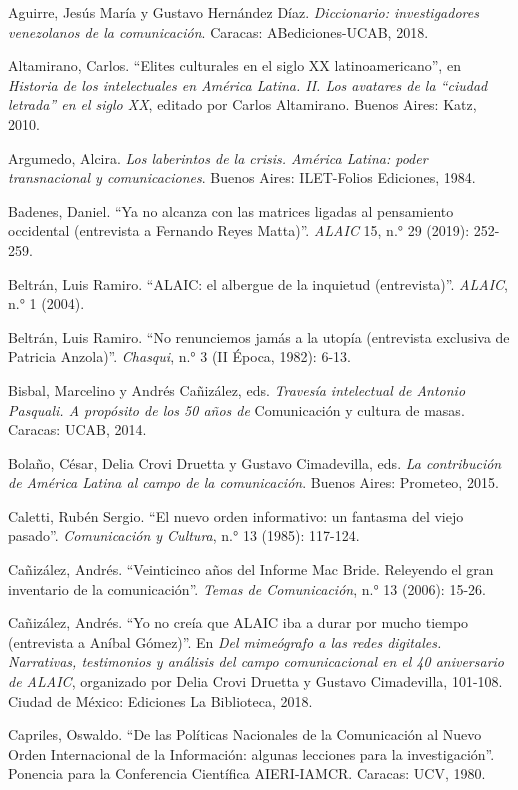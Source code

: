 \documentclass{tufte-handout}
\begin{document}
\begin{hangparas}{.25in}{1} 



Aguirre, Jesús María y Gustavo Hernández Díaz. \emph{Diccionario:
investigadores venezolanos de la comunicación}. Caracas:
ABediciones-UCAB, 2018.

Altamirano, Carlos. ``Elites culturales en el siglo XX
latinoamericano'', en \emph{Historia de los intelectuales en América
Latina. II. Los avatares de la ``ciudad letrada'' en el siglo XX},
editado por Carlos Altamirano. Buenos Aires: Katz, 2010.

Argumedo, Alcira. \emph{Los laberintos de la crisis. América Latina:
poder transnacional y comunicaciones}. Buenos Aires: ILET-Folios
Ediciones, 1984.

Badenes, Daniel. ``Ya no alcanza con las matrices ligadas al pensamiento
occidental (entrevista a Fernando Reyes Matta)''. \emph{ALAIC} 15, n.°
29 (2019): 252-259.

Beltrán, Luis Ramiro. ``ALAIC: el albergue de la inquietud
(entrevista)''. \emph{ALAIC}, n.° 1 (2004).

Beltrán, Luis Ramiro. ``No renunciemos jamás a la utopía (entrevista
exclusiva de Patricia Anzola)''. \emph{Chasqui}, n.° 3 (II Época, 1982):
6-13.

Bisbal, Marcelino y Andrés Cañizález, eds. \emph{Travesía intelectual de
Antonio Pasquali. A propósito de los 50 años de} Comunicación y cultura
de masas. Caracas: UCAB, 2014.

Bolaño, César, Delia Crovi Druetta y Gustavo Cimadevilla, eds. \emph{La
contribución de América Latina al campo de la comunicación}. Buenos
Aires: Prometeo, 2015.

Caletti, Rubén Sergio. ``El nuevo orden informativo: un fantasma del
viejo pasado''. \emph{Comunicación y Cultura}, n.° 13 (1985): 117-124.

Cañizález, Andrés. ``Veinticinco años del Informe Mac Bride. Releyendo
el gran inventario de la comunicación''. \emph{Temas de Comunicación},
n.° 13 (2006): 15-26.

Cañizález, Andrés. ``Yo no creía que ALAIC iba a durar por mucho tiempo
(entrevista a Aníbal Gómez)''. En \emph{Del mimeógrafo a las redes
digitales. Narrativas, testimonios y análisis del campo comunicacional
en el 40 aniversario de ALAIC}, organizado por Delia Crovi Druetta y
Gustavo Cimadevilla, 101-108. Ciudad de México: Ediciones La Biblioteca,
2018.

Capriles, Oswaldo. ``De las Políticas Nacionales de la Comunicación al
Nuevo Orden Internacional de la Información: algunas lecciones para la
investigación''. Ponencia para la Conferencia Científica AIERI-IAMCR.
Caracas: UCV, 1980.


\end{hangparas}
\end{document}
